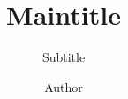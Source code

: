 \documentclass{thesis}
\title{Maintitle}
\subtitle{Subtitle}
\author{Author}
\institute{Institute}
\begin{document}

\cleardoublepage

\tableofcontents
\cleardoublepage

\startTextChapters


\end{document}
